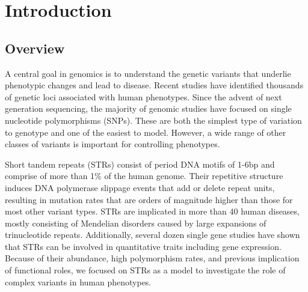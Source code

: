 \chapter{Introduction}

\section{Overview}

A central goal in genomics is to understand the genetic variants that underlie phenotypic changes and lead to disease. Recent studies have identified thousands of genetic loci associated with human phenotypes. Since the advent of next generation sequencing, the majority of genomic studies have focused on single nucleotide polymorphisms (SNPs). These are both the simplest type of variation to genotype and one of the easiest to model. However, a wide range of other classes of variants is important for controlling phenotypes.

Short tandem repeats (STRs) consist of period DNA motifs of 1-6bp and comprise of more than 1\% of the human genome. Their repetitive structure induces DNA polymerase slippage events that add or delete repeat units, resulting in mutation rates that are orders of magnitude higher than those for most other variant types. STRs are implicated in more than 40 human diseases, mostly consisting of Mendelian disorders caused by large expansions of trinucleotide repeats. Additionally, several dozen single gene studies have shown that STRs can be involved in quantitative traits including gene expression. Because of their abundance, high polymorphism rates, and previous implication of functional roles, we focused on STRs as a model to investigate the role of complex variants in human phenotypes.

